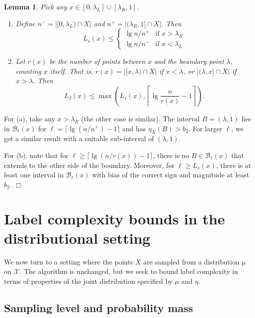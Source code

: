 \documentclass{article}
\def\X{{\mathcal X}}
\def\B{{\mathcal B}}
\newtheorem{lemma}[thm]{Lemma}
\newenvironment{proof}{\noindent {\sc Proof:}}{$\Box$ \medskip}
\begin{document}
\begin{lemma}
Pick any $x \in [0, \lambda_L] \cup [\lambda_R, 1]$.
\begin{enumerate}
\item[(a)] Define $n^- = |[0,\lambda_L) \cap X|$ and $n^+ = |(\lambda_R,1] \cap X|$. Then
$$
L_s(x)
\leq
\left\{
\begin{array}{ll}
\lg n/n^+ & \mbox{if $x > \lambda_R$} \\
\lg n/n^- & \mbox{if $x < \lambda_L$}
\end{array}
\right.
$$
\item[(b)] Let $r(x)$ be the number of points between $x$ and the boundary point $\lambda$, counting $x$ itself. That is, $r(x) = |[x,\lambda) \cap X|$ if $x < \lambda$, or $|(\lambda, x] \cap X|$ if $x > \lambda$. Then
$$ L_f(x) \leq \max\left( L_s(x), \left\lceil \lg \frac{n}{r(x)} -1 \right\rceil \right).$$
\end{enumerate}
\label{lemma:oned-monotonic-Lsf}
\end{lemma}
\begin{proof}
For (a), take any $x > \lambda_R$ (the other case is similar). The interval $B = (\lambda,1)$ lies in $\B_\ell(x)$ for $\ell = \lceil \lg (n/n^+) - 1 \rceil$ and has $\eta_X(B) > b_2$. For larger $\ell$, we get a similar result with a suitable sub-interval of $(\lambda,1)$.

For (b), note that for $\ell \geq \lceil \lg (n/r(x)) - 1 \rceil$, there is no $B \in \B_\ell(x)$ that extends to the other side of the boundary. Moreover, for $\ell \geq L_s(x)$, there is at least one interval in $\B_\ell(x)$ with bias of the correct sign and magnitude at least $b_2$.
\end{proof}

\section{Label complexity bounds in the distributional setting}

We now turn to a setting where the points $X$ are sampled from a distribution $\mu$ on $\X$. The algorithm is unchanged, but we seek to bound label complexity in terms of properties of the joint distribution specified by $\mu$ and $\eta$.

\subsection{Sampling level and probability mass}
\end{document}
